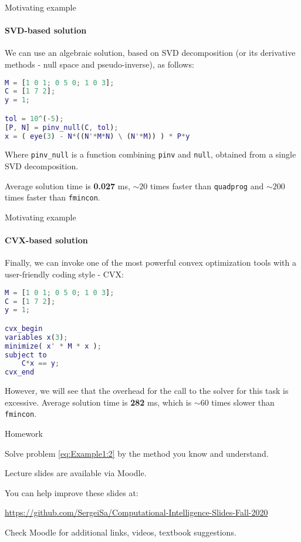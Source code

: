 \documentclass{beamer}
\begin{document}
\begin{frame}[fragile]{Motivating example}
\framesubtitle{SVD-based solution}
\begin{flushleft}

We can use an algebraic solution, based on SVD decomposition (or its derivative methods - null space and pseudo-inverse), as follows:

\begin{lstlisting}[language=Matlab]
M = [1 0 1; 0 5 0; 1 0 3]; 
C = [1 7 2]; 
y = 1;

tol = 10^(-5);
[P, N] = pinv_null(C, tol);
x = ( eye(3) - N*((N'*M*N) \ (N'*M)) ) * P*y
\end{lstlisting}

Where \texttt{pinv\_null} is a function combining \texttt{pinv} and \texttt{null}, obtained from a single SVD decomposition.

Average solution time is \textbf{0.027} ms, $\sim 20$ times faster than \texttt{quadprog} and $\sim 200$ times faster than \texttt{fmincon}.

\end{flushleft}
\end{frame}



\begin{frame}[fragile]{Motivating example}
\framesubtitle{CVX-based solution}
\begin{flushleft}

Finally, we can invoke one of the most powerful convex optimization tools with a user-friendly coding style - CVX:

\begin{lstlisting}[language=Matlab]
M = [1 0 1; 0 5 0; 1 0 3];
C = [1 7 2];
y = 1;

cvx_begin
variables x(3);
minimize( x' * M * x );
subject to
    C*x == y;
cvx_end
\end{lstlisting}

However, we will see that the overhead for the call to the solver for this task is excessive. Average solution time is \textbf{282} ms, which is $\sim 60$ times slower than \texttt{fmincon}.

\end{flushleft}
\end{frame}




\begin{frame}{Homework}
\begin{flushleft}

Solve problem \eqref{eq:Example1:2} by the method you know and understand.

\end{flushleft}
\end{frame}




\begin{frame}
\centerline{Lecture slides are available via Moodle.}
\bigskip
\centerline{You can help improve these slides at:}
\centerline{\url{https://github.com/SergeiSa/Computational-Intelligence-Slides-Fall-2020}}
\bigskip
\centerline{Check Moodle for additional links, videos, textbook suggestions.}
\end{frame}
\end{document}
